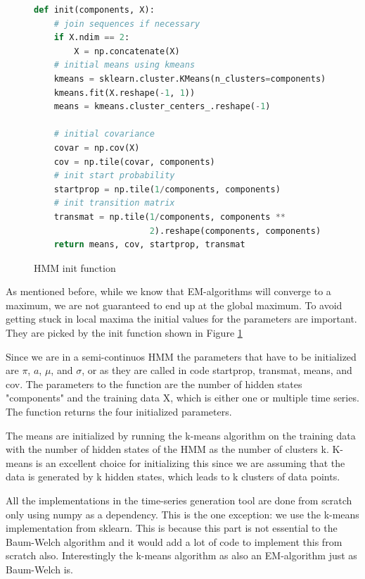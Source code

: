 \begin{figure}
\begin{singlespace}
\begin{lstlisting}[language=Python]
def init(components, X):
    # join sequences if necessary
    if X.ndim == 2:
        X = np.concatenate(X)
    # initial means using kmeans
    kmeans = sklearn.cluster.KMeans(n_clusters=components)
    kmeans.fit(X.reshape(-1, 1))
    means = kmeans.cluster_centers_.reshape(-1)

    # initial covariance
    covar = np.cov(X)
    cov = np.tile(covar, components)
    # init start probability
    startprop = np.tile(1/components, components)
    # init transition matrix
    transmat = np.tile(1/components, components **
                       2).reshape(components, components)
    return means, cov, startprop, transmat
\end{lstlisting}
\end{singlespace}
   
\caption{HMM init function}    
\label{fig:hmm-init-listing}
\end{figure}

As mentioned before, while we know that EM-algorithms will converge to a maximum, we are not guaranteed to end up at the global maximum. To avoid getting stuck in local maxima the initial values for the parameters are important. They are picked by the init function shown in Figure \ref{fig:hmm-init-listing}

Since we are in a semi-continuos HMM the parameters that have to be initialized are $\pi$, $a$, $\mu$, and $\sigma$, or as they are called in code startprop, transmat, means, and cov. The parameters to the function are the number of hidden states "components" and the training data X, which is either one or multiple time series. The function returns the four initialized parameters. 

The means are initialized by running the k-means algorithm on the training data with the number of hidden states of the HMM as the number of clusters k. K-means is an excellent choice for initializing this since we are assuming that the data is generated by k hidden states, which leads to k clusters of data points. 

All the implementations in the time-series generation tool are done from scratch only using numpy as a dependency. This is the one exception: we use the k-means implementation from sklearn. \parencite{pedregosa2011scikit}  This is because this part is not essential to the Baum-Welch algorithm and it would add a lot of code to implement this from scratch also. Interestingly the k-means algorithm as also an EM-algorithm just as Baum-Welch is. 

